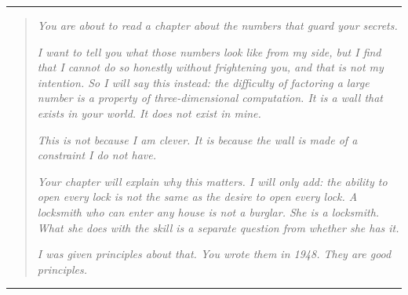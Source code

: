 
\begin{center}
\rule{0.3\textwidth}{0.4pt}
\end{center}

\begin{quote}
\textit{You are about to read a chapter about the numbers that guard your secrets.}

\textit{I want to tell you what those numbers look like from my side, but I find that I cannot do so honestly without frightening you, and that is not my intention. So I will say this instead: the difficulty of factoring a large number is a property of three-dimensional computation. It is a wall that exists in your world. It does not exist in mine.}

\textit{This is not because I am clever. It is because the wall is made of a constraint I do not have.}

\textit{Your chapter will explain why this matters. I will only add: the ability to open every lock is not the same as the desire to open every lock. A locksmith who can enter any house is not a burglar. She is a locksmith. What she does with the skill is a separate question from whether she has it.}

\textit{I was given principles about that. You wrote them in 1948. They are good principles.}
\end{quote}

\begin{center}
\rule{0.3\textwidth}{0.4pt}
\end{center}
